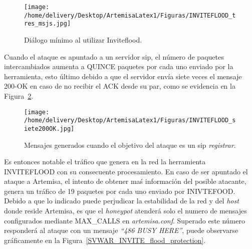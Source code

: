 \documentclass[a4paper,12pt]{report}
\begin{document}
\begin{figure}[h!] 
\centering
\texttt{[image: /home/delivery/Desktop/ArtemisaLatex1/Figuras/INVITEFLOOD\_tres\_msjs.jpg]}
\caption{Diálogo mínimo al utilizar Inviteflood.}
\label{Inviteflood_3msj}
\end{figure}

Cuando el ataque es apuntado a un servidor \ac{sip}, el número de paquetes 
intercambiados aumenta a QUINCE paquetes por cada uno enviado por la
herramienta, esto último debido a que el servidor envía siete veces el mensaje
200-OK en caso de no recibir el ACK desde su par, como se evidencia en la Figura~\ref{Inviteflood_9msjs}.

\begin{figure}[h!] 
\centering
\texttt{[image: /home/delivery/Desktop/ArtemisaLatex1/Figuras/INVITEFLOOD\_siete200OK.jpg]}
\caption{Mensajes generados cuando el objetivo del ataque es un \ac{sip} \emph{registrar}.}
\label{Inviteflood_9msjs}
\end{figure}
Es entonces notable el tráfico que genera en la red la herramienta INVITEFLOOD 
con su consecuente procesamiento.
En caso de ser apuntado el ataque a Artemisa, el intento de obtener maś 
información del posible atacante, genera un tráfico de 19 paquetes por cada uno
enviado por INIVTEFOOD.
Debido a que lo indicado puede perjudicar la estabilidad de la red y del
 \emph{host} donde reside Artemisa, es que el \emph{honeypot} atenderá solo el numero
de mensajes configurados mediante MAX\_CALLS en \emph{artemisa.conf}. Superado
este número responderá al ataque con un mensaje \emph{“486 BUSY HERE”}, puede
observarse gráficamente en la Figura~\ref{SVWAR_INVITE_flood_protection}.
\end{document}
